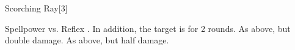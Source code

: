 \begin{spellsection}{Scorching Ray}[3]
    \begin{spellheader}
    \end{spellheader}
    \begin{spellcontent}
        \begin{spelltargetinginfo}
        \end{spelltargetinginfo}
        \begin{spelleffects}
            \begin{spellattack}{Spellpower vs. Reflex}
                \spellsuccess {}. In addition, the target is \ignited for 2 rounds.
                \spellcritical As above, but double damage.
                \spellfailure As above, but half damage.
            \end{spellattack}
        \end{spelleffects}
    \end{spellcontent}
    \begin{spellfooter}
        \miscastrandom
    \end{spellfooter}
    \begin{spellaugments}
    \end{spellaugments}
\end{spellsection}

